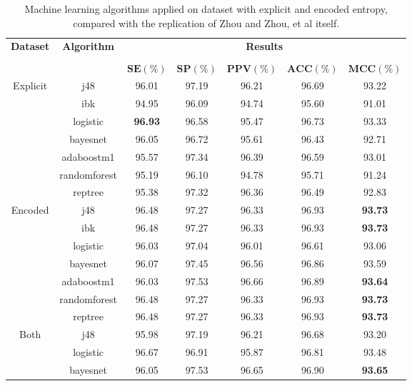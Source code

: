 \begin{table}[h]
\begin{center}
\begin{threeparttable}
\caption[State of the art algorithm replication performance.]{Machine learning algorithms applied on dataset with explicit and encoded entropy, compared with the replication of Zhou and Zhou, et al \cite{zhou2015} itself.}
\label{table:zhou_hr_and_unimol}
\scriptsize
  \begin{tabular}{c c c c c c c}
  \toprule
  \textbf{Dataset} & \textbf{Algorithm} & \multicolumn{5}{c}{\textbf{Results}} \\
  \cline{3-7}
  \\
  & & $\mathbf{SE(\%)}$ & $\mathbf{SP(\%)}$ & $\mathbf{PPV(\%)}$ & $\mathbf{ACC(\%)}$ & $\mathbf{MCC(\%)}$\\
  \midrule  
  Explicit & j48 & 96.01 & 97.19 & 96.21 & 96.69 & 93.22 \\
  & ibk & 94.95 & 96.09 & 94.74 & 95.60 & 91.01 \\
  & logistic & \textbf{96.93} & 96.58 & 95.47 & 96.73 & 93.33 \\
  & bayesnet & 96.05 & 96.72 & 95.61 & 96.43 & 92.71 \\
  & adaboostm1 & 95.57 & 97.34 & 96.39 & 96.59 & 93.01 \\
  & randomforest & 95.19 & 96.10 & 94.78 & 95.71 & 91.24 \\
  & reptree & 95.38 & 97.32 & 96.36 & 96.49 & 92.83 \\
  \hline
  Encoded & j48 &  96.48 &  97.27 &  96.33 &  96.93 &  \textbf{93.73} \\
  & ibk &  96.48 &  97.27 &  96.33 &  96.93 &  \textbf{93.73} \\
  & logistic &  96.03 &  97.04 &  96.01 &  96.61 &  93.06 \\
  & bayesnet &  96.07 &  97.45 &  96.56 &  96.86 &  93.59 \\
  & adaboostm1 &  96.03 &  97.53 &  96.66 &  96.89 &  \textbf{93.64} \\
  & randomforest & 96.48 &  97.27 &  96.33 &  96.93 &  \textbf{93.73} \\
  & reptree & 96.48 &  97.27 &  96.33 &  96.93 &  \textbf{93.73} \\
  \hline
  Both & j48 & 95.98 & 97.19 & 96.21 & 96.68 & 93.20 \\
  & logistic & 96.67 & 96.91 & 95.87 & 96.81 & 93.48 \\
  & bayesnet & 96.05 & 97.53 & 96.65 & 96.90 & \textbf{93.65} \\

\end{tabular}
\end{threeparttable}
\end{center}
\end{table}
